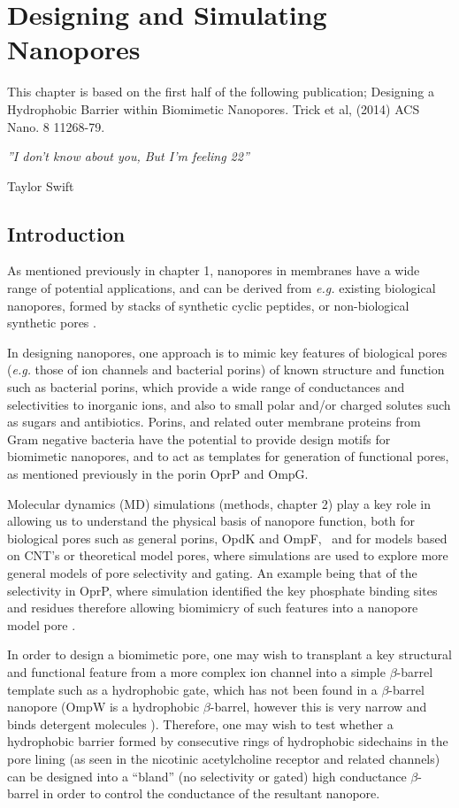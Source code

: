 \chapter{Designing and Simulating Nanopores}
\label{ch:RC1}

This chapter is based on the first half of the following publication;
Designing a Hydrophobic Barrier within Biomimetic Nanopores. Trick et al,  (2014)
ACS Nano. 8 11268-79.

\epigraph{{\textit{''I don't know about you, But I'm feeling 22''}}}{Taylor Swift}

\section{Introduction}
As mentioned previously in chapter 1, nanopores in membranes have a wide range of potential applications, and can be derived from \textit{e.g.} existing biological nanopores, formed by stacks of synthetic cyclic peptides, or non-biological synthetic pores \cite{Ghadiri1994,Clark1999,Sakai2013}.

In designing nanopores, one approach is to mimic key features of biological pores (\textit{e.g.} those of ion channels and bacterial porins) of known structure and function such as bacterial porins, which provide a wide range of conductances and selectivities to inorganic ions, and also to small polar and/or charged solutes such as sugars and antibiotics. Porins, and related outer membrane proteins from Gram negative bacteria have the potential to provide design motifs for biomimetic nanopores, and to act as templates for generation of functional pores, as mentioned previously in the porin OprP and OmpG.

Molecular dynamics (MD) simulations (methods, chapter 2) play a key role in allowing us to understand the physical basis of nanopore function, both for biological pores such as general porins, OpdK and OmpF, \ahl\ and for models based on CNT's or theoretical model pores, where simulations are used to explore more general models of pore selectivity and gating. An example being that of the selectivity in OprP, where simulation identified the key phosphate binding sites and residues \cite{Pongprayoon2009,Modi2012d,Modi2014} therefore allowing biomimicry of such features into a nanopore model pore \cite{Pongprayoon2012}. 

In order to design a biomimetic pore, one may wish to transplant a key structural and functional feature from a more complex ion channel into a simple $\beta$-barrel template such as a hydrophobic gate, which has not been found in a $\beta$-barrel nanopore (OmpW is a hydrophobic $\beta$-barrel, however this is very narrow and binds detergent molecules \cite{Hong2006}). Therefore, one may wish to test whether a hydrophobic barrier formed by consecutive rings of hydrophobic sidechains in the pore lining (as seen in the nicotinic acetylcholine receptor and related channels) can be designed into a ``bland'' (no selectivity or gated) high conductance $\beta$-barrel in order to control the conductance of the resultant nanopore.

